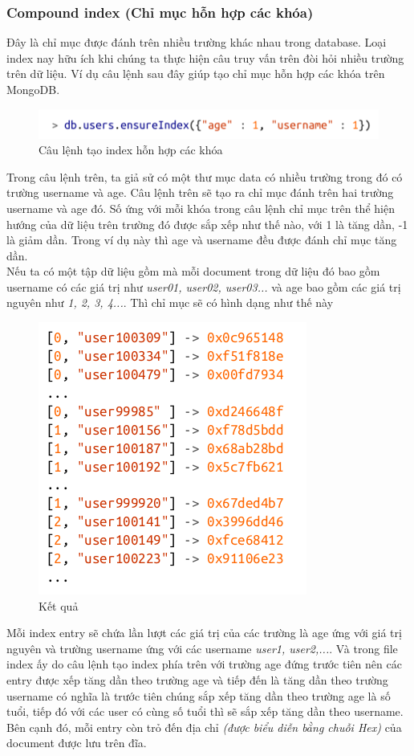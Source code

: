 \subsubsection{Compound index (Chỉ mục hỗn hợp các khóa)}
Đây là chỉ mục được đánh trên nhiều trường khác nhau trong database. Loại index nay hữu ích khi chúng ta thực hiện câu truy vấn trên đòi hỏi nhiều trường trên dữ liệu. Ví dụ câu lệnh sau đây giúp tạo chỉ mục hỗn hợp các khóa trên MongoDB.\\
\begin{figure}[h!]
		\centering
		\includegraphics[scale=0.8]{charts/cpindex1.png}
		\caption{Câu lệnh tạo index hỗn hợp các khóa}
		\label{fig:cpindex}
\end{figure}
Trong câu lệnh trên, ta giả sử có một thư mục data có nhiều trường trong đó có trường username và age. Câu lệnh trên sẽ tạo ra chỉ mục đánh trên hai trường username và age đó. Số ứng với mỗi khóa trong câu lệnh chỉ mục trên thể hiện hướng của dữ liệu trên trường đó được sắp xếp như thế nào, với 1 là tăng dần, -1 là giảm dần. Trong ví dụ này thì age và username đều được đánh chỉ mục tăng dần.\\
Nếu ta có một tập dữ liệu gồm mà mỗi document trong dữ liệu đó bao gồm username có các giá trị như \textit{user01, user02, user03...} và age bao gồm các giá trị nguyên như \textit{1, 2, 3, 4...}. Thì chỉ mục sẽ có hình dạng như thế này
\pagebreak 
\begin{figure}[h!]
		\centering
		\includegraphics[scale=0.5]{charts/result.png}
		\caption{Kết quả}
		\label{fig:result}
\end{figure}
Mỗi index entry sẽ chứa lần lượt các giá trị của các trường là age ứng với giá trị nguyên và trường username ứng với các username \textit{user1, user2,...}. Và trong file index ấy do câu lệnh tạo index phía trên với trường age đứng trước tiên nên các entry được xếp tăng dần theo trường age và tiếp đến là tăng dần theo trường username có nghĩa là trước tiên chúng sắp xếp tăng dần theo trường age là số tuổi, tiếp đó với các user có cùng số tuổi thì sẽ sắp xếp tăng dần theo username. Bên cạnh đó, mỗi entry còn trỏ đến địa chỉ \textit{(được biểu diễn bằng chuỗi Hex)} của document được lưu trên đĩa.

